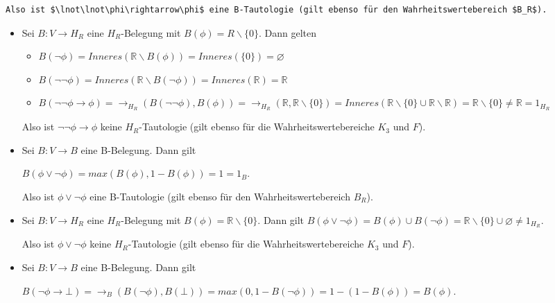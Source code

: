 \documentclass[a4paper]{article}
\begin{document}
\begin{multicols}{3}
\begin{verbatim}
Also ist $\lnot\lnot\phi\rightarrow\phi$ eine B-Tautologie (gilt ebenso für den Wahrheitswertebereich $B_R$).
\end{verbatim}

  \begin{itemize}
    \item
          Sei $B:V\rightarrow H_R$ eine $H_R$-Belegung mit
          $B(\phi) =R\backslash\{0\}$. Dann gelten

          \begin{itemize}
            \item
                  $B(\lnot\phi) = Inneres(\mathbb{R}\backslash B(\phi)) = Inneres(\{0\}) =\varnothing$
            \item
                  $B(\lnot\lnot\phi) = Inneres(\mathbb{R}\backslash B(\lnot\phi)) = Inneres(\mathbb{R}) = \mathbb{R}$
            \item
                  $B(\lnot\lnot\phi\rightarrow\phi) = \rightarrow_{H_R} (B(\lnot\lnot\phi),B(\phi)) = \rightarrow_{H_R} (\mathbb{R},\mathbb{R}\backslash \{0\}) = Inneres(\mathbb{R}\backslash\{0\}\cup\mathbb{R}\backslash\mathbb{R}) = \mathbb{R}\backslash\{0\}\not =\mathbb{R}= 1_{H_R}$
          \end{itemize}

          Also ist $\lnot\lnot\phi\rightarrow\phi$ keine $H_R$-Tautologie (gilt
          ebenso für die Wahrheitswertebereiche $K_3$ und $F$).
    \item
          Sei $B:V\rightarrow B$ eine B-Belegung. Dann gilt

          $B(\phi\vee\lnot\phi) = max(B(\phi), 1 -B(\phi)) = 1 = 1_B$.

          Also ist $\phi\vee\lnot\phi$ eine B-Tautologie (gilt ebenso für den
          Wahrheitswertebereich $B_R$).
    \item
          Sei $B:V\rightarrow H_R$ eine $H_R$-Belegung mit
          $B(\phi)=\mathbb{R}\backslash\{0\}$. Dann gilt
          $B(\phi\vee\lnot\phi) = B(\phi)\cup B(\lnot\phi) = \mathbb{R}\backslash\{0\}\cup \varnothing \not= 1_{H_R}$.

          Also ist $\phi\vee\lnot\phi$ keine $H_R$-Tautologie (gilt ebenso für
          die Wahrheitswertebereiche $K_3$ und $F$).
    \item
          Sei $B:V\rightarrow B$ eine B-Belegung. Dann gilt

          $B(\lnot\phi\rightarrow\bot) = \rightarrow_B(B(\lnot\phi),B(\bot)) = max(0,1-B(\lnot \phi)) = 1 -( 1 -B(\phi)) =B(\phi)$.


\end{itemize}
\end{multicols}
\end{document}
